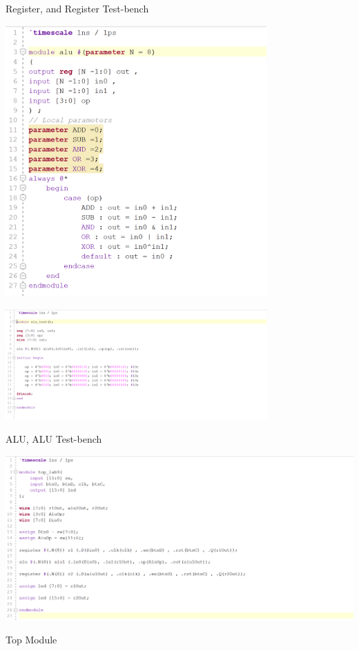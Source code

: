 \documentclass[]{report}
\begin{document}
	\begin{center}
		
		Register, and Register Test-bench
		
	\end{center}
	
	\clearpage
	
	\begin{center}\includegraphics[width=0.75\textwidth]{ALU.png}\end{center}
	
	\begin{center}\includegraphics[width=0.75\textwidth]{aluTest.png}\end{center}
	
	\begin{center}
		
		ALU, ALU Test-bench
		
	\end{center}
	
	\clearpage
	
	\begin{center}\includegraphics[width=1.0\textwidth]{top.png}\end{center}
	
	\begin{center}
		
		Top Module
		
	\end{center}
	
	
	
	
	
	
	
	
\end{document}
